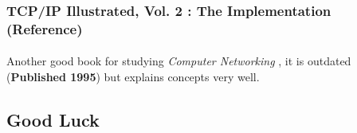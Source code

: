 \documentclass[12pt, a4paper]{article}
\begin{document}
\subsubsection*{TCP/IP Illustrated, Vol. 2 : The Implementation (Reference)}
\paragraph{}
Another good book for studying \emph{Computer Networking} , it is outdated (\textbf{Published 1995}) but explains concepts very well.

\begin{huge}
\section*{Good Luck}
\paragraph{}
\end{huge}
\end{document}
